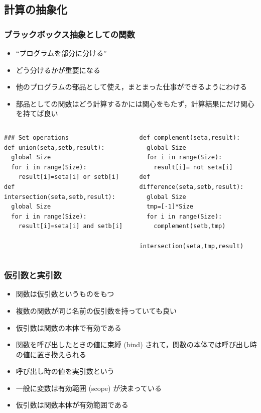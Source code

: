 \subsection{計算の抽象化}
\begin{frame}
\frametitle{ブラックボックス抽象としての関数}
  \begin{itemize}
\item ``プログラムを部分に分ける''
\item どう分けるかが重要になる
\item 他のプログラムの部品として使え，まとまった仕事ができるようにわける
\item 部品としての関数はどう計算するかには関心をもたず，計算結果にだけ関心を持てば良い
  \end{itemize}
  \begin{columns}[t]
    \begin{column}{0.45\textwidth}
      \begin{lstlisting}[caption={集合演算},label=lst:fun_abst]
### Set operations
def union(seta,setb,result):
  global Size
  for i in range(Size):
    result[i]=seta[i] or setb[i]
def intersection(seta,setb,result):
  global Size
  for i in range(Size):
    result[i]=seta[i] and setb[i]
      \end{lstlisting}
    \end{column}
    \begin{column}{0.45\textwidth}
      \begin{lstlisting}[caption={集合演算},label=lst:fun_abst2,firstnumber=last]
def complement(seta,result):
  global Size
  for i in range(Size):
    result[i]= not seta[i]
def difference(seta,setb,result):
  global Size
  tmp=[-1]*Size
  for i in range(Size):
    complement(setb,tmp)
    intersection(seta,tmp,result)
      \end{lstlisting}
    \end{column}
  \end{columns}
\end{frame}
\begin{frame}[fragile]
\frametitle{仮引数と実引数}
  \begin{itemize}
\item 関数は仮引数というものをもつ
\item 複数の関数が同じ名前の仮引数を持っていても良い
\item 仮引数は関数の本体で有効である
\item 関数を呼び出したときの値に束縛 (bind) されて，関数の本体では呼び出し時の値に置き換えられる
\item 呼び出し時の値を実引数という
\item 一般に変数は有効範囲 (scope) が決まっている
\item 仮引数は関数本体が有効範囲である
  \end{itemize}
\end{frame}
%
%
